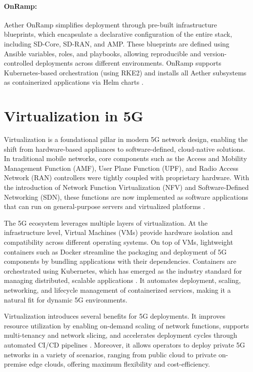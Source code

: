 \paragraph{OnRamp:}  
Aether OnRamp simplifies deployment through pre-built infrastructure blueprints, which encapsulate a declarative configuration of the entire stack, including SD-Core, SD-RAN, and AMP. These blueprints are defined using Ansible variables, roles, and playbooks, allowing reproducible and version-controlled deployments across different environments. OnRamp supports Kubernetes-based orchestration (using RKE2) and installs all Aether subsystems as containerized applications via Helm charts \cite{onramp_docs}.




\section{Virtualization in 5G}
\label{sec:virtualization_5g}

Virtualization is a foundational pillar in modern 5G network design, enabling the shift from hardware-based appliances to software-defined, cloud-native solutions. In traditional mobile networks, core components such as the Access and Mobility Management Function (AMF), User Plane Function (UPF), and Radio Access Network (RAN) controllers were tightly coupled with proprietary hardware. With the introduction of Network Function Virtualization (NFV) and Software-Defined Networking (SDN), these functions are now implemented as software applications that can run on general-purpose servers and virtualized platforms \cite{nfv_sdn_intro}.

The 5G ecosystem leverages multiple layers of virtualization. At the infrastructure level, Virtual Machines (VMs) provide hardware isolation and compatibility across different operating systems. On top of VMs, lightweight containers such as Docker streamline the packaging and deployment of 5G components by bundling applications with their dependencies. Containers are orchestrated using Kubernetes, which has emerged as the industry standard for managing distributed, scalable applications \cite{5g_kubernetes_cnfs}. It automates deployment, scaling, networking, and lifecycle management of containerized services, making it a natural fit for dynamic 5G environments.

Virtualization introduces several benefits for 5G deployments. It improves resource utilization by enabling on-demand scaling of network functions, supports multi-tenancy and network slicing, and accelerates deployment cycles through automated CI/CD pipelines \cite{etsi_nfv}. Moreover, it allows operators to deploy private 5G networks in a variety of scenarios, ranging from public cloud to private on-premise edge clouds, offering maximum flexibility and cost-efficiency.

